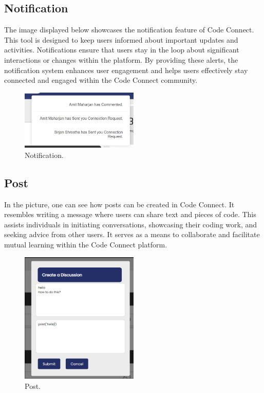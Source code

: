 \subsection{Notification}
The image displayed below showcases the notification feature of Code Connect. This tool is designed to keep users informed about important updates and activities. Notifications ensure that users stay in the loop about significant interactions or changes within the platform. By providing these alerts, the notification system enhances user engagement and helps users effectively stay connected and engaged within the Code Connect community.
\begin{figure}[H]
    \centering
    \includegraphics[width=0.5\textwidth]{Outcome-ss/notification.png}
    \caption{Notification.}
    \label{fig:Notification}
\end{figure}

\newpage
\subsection{Post}
In the picture, one can see how posts can be created in Code Connect. It resembles writing a message where users can share text and pieces of code. This assists individuals in initiating conversations, showcasing their coding work, and seeking advice from other users. It serves as a means to collaborate and facilitate mutual learning within the Code Connect platform.
\begin{figure}[H]
    \centering
    \includegraphics[width=0.5\textwidth]{Outcome-ss/post.png}
    \caption{Post.}
    \label{fig:Post}
\end{figure}

